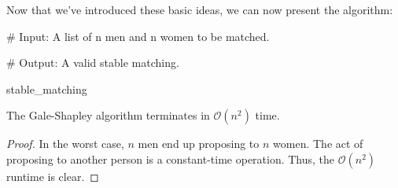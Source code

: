 Now that we've introduced these basic ideas, we can now present the algorithm:


\vspace{1em}
\hline
\vspace{1em}

\begin{allintypewriter}
\# Input: A list of n men and n women to be matched. 

\hspace{0.5cm} 

\# Output: A valid stable matching.


\hspace{0.5cm}


stable\_matching 

\end{allintypewriter}
\vspace{1em}
\hline
\vspace{1em}


\begin{proposition}
The Gale-Shapley algorithm terminates in $\mathcal{O}(n^2)$ time. 
\end{proposition}
\begin{proof}
In the worst case, $n$ men end up proposing to $n$ women. The act of proposing to another person is a constant-time operation. Thus, the $\mathcal{O}(n^2)$ runtime is clear.
\end{proof}%